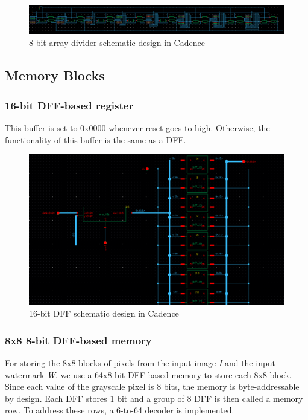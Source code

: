 \documentclass[letterpaper, 11pt]{article}
\begin{document}
	\begin{figure}[htb!]
		\centering
		\includegraphics[width=0.85\linewidth]{report_pics/div8b_schem.png}
		\caption{8 bit array divider schematic design in Cadence}
		\label{fig15}
	\end{figure}
	
	\newpage
	\subsection{Memory Blocks}
	\label{subsec:mem}
	
	\subsubsection{16-bit DFF-based register}
	This buffer is set to 0x0000 whenever reset goes to high. Otherwise, the functionality of this buffer is the same as a DFF.
	
	\begin{figure}[htb!]
		\centering
		\includegraphics[width=0.85\linewidth]{report_pics/16b_dff_schematic.png}
		\caption{16-bit DFF schematic design in Cadence}
		\label{fig16}
	\end{figure}
	
	\newpage
	
	\subsubsection{8x8 8-bit DFF-based memory}
	For storing the 8x8 blocks of pixels from the input image \textit{I} and the input watermark \textit{W}, we use a 64x8-bit DFF-based memory to store each 8x8 block. Since each value of the grayscale pixel is 8 bits, the memory is byte-addressable by design. Each DFF stores 1 bit and a group of 8 DFF is then called a memory row. To address these rows, a 6-to-64 decoder is implemented.
	
\end{document}
